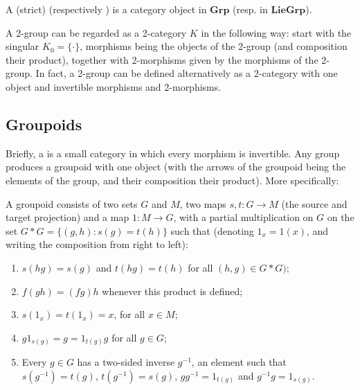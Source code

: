 \begin{definition}
 A (strict) \label{sec:2group} (respectively ) is a category object in $\mathbf{Grp}$ (resp. in $\mathbf{LieGrp}$).
\end{definition}


A 2-group can be regarded as a 2-category $K$ in the following way: start with the singular $K_0=\{\cdotp\}$, morphisms being the objects of the 2-group (and composition their product), together with 2-morphisms given by the morphisms of the 2-group. In fact, a 2-group can be defined alternatively as a 2-category with one object and invertible morphisms and 2-morphisms.



\subsection{Groupoids}

Briefly, a  is a small category in which every morphism is invertible. Any group produces a groupoid with one object (with the arrows of the groupoid being the elements of the group, and their composition their product). More specifically:

\begin{definition}
 A groupoid consists of two sets $G$ and $M$, two maps $s,t: G\rightarrow M$ (the source and target projection) and a map $1:M\rightarrow G$, with a partial multiplication on $G$ on the set $G*G=\{(g,h):s(g)=t(h) \}$ such that (denoting $1_x=1(x)$, and writing the composition from right to left):
\begin{enumerate}
 \item $s(hg)=s(g)$ and $t(hg)=t(h)$ for all $(h,g)\in G*G)$;
\item $f(gh)=(fg)h$ whenever this product is defined;
\item $s(1_x)=t(1_x)=x$, for all $x\in M$;
\item $g1_{s(g)}=g=1_{t(g)}g$ for all $g\in G$;
\item Every $g\in G$ has a two-sided inverse $g^{-1}$, an element such that $s(g^{-1})=t(g)$, $t(g^{-1})=s(g)$, $gg^{-1}=1_{t(g)}$ and $g^{-1}g=1_{s(g)}$.
\end{enumerate}
\end{definition}

